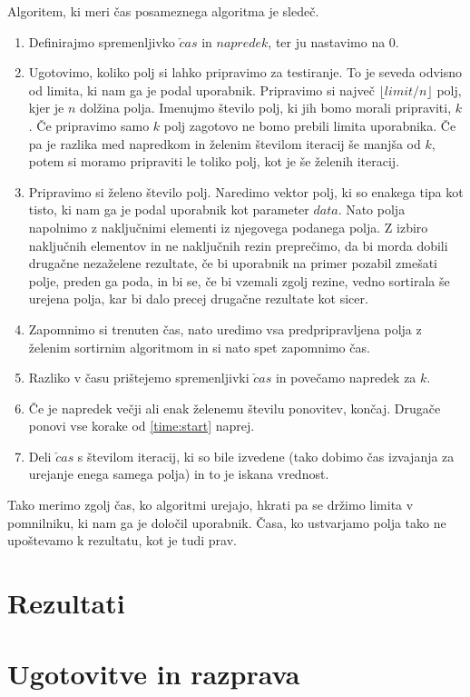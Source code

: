 \documentclass[a4paper,oneside]{article}
\begin{document}
Algoritem, ki meri čas posameznega algoritma je sledeč.
\begin{enumerate}
  \item Definirajmo spremenljivko $\check{c}as$ in $napredek$, ter ju nastavimo na 0.
  \item \label{time:start} Ugotovimo, koliko polj si lahko pripravimo za testiranje. To je seveda odvisno od
    limita, ki nam ga je podal uporabnik. Pripravimo si največ $\lfloor limit/n \rfloor$
    polj, kjer je $n$ dolžina polja. Imenujmo število polj, ki jih bomo morali pripraviti, $k$.
    Če pripravimo samo $k$ polj zagotovo ne bomo prebili limita uporabnika.
    Če pa je razlika med napredkom in želenim številom iteracij še manjša
    od $k$, potem si  moramo pripraviti le toliko polj, kot je še želenih iteracij.
  \item Pripravimo si želeno število polj. Naredimo vektor polj, ki so enakega tipa
     kot tisto, ki nam ga je podal uporabnik kot parameter $data$. Nato polja napolnimo z
     naključnimi elementi iz njegovega podanega polja. Z izbiro naključnih elementov in ne 
     naključnih rezin preprečimo, da bi morda dobili drugačne nezaželene rezultate, če bi
     uporabnik na primer pozabil zmešati polje, preden ga poda, in bi se, če bi vzemali 
     zgolj rezine, vedno sortirala še urejena polja, kar bi dalo precej drugačne rezultate 
     kot sicer.
  \item Zapomnimo si trenuten čas, nato uredimo vsa predpripravljena polja z želenim
     sortirnim algoritmom in si nato spet zapomnimo čas.
  \item Razliko v času prištejemo spremenljivki $\check{c}as$ in povečamo napredek za $k$. 
  \item Če je napredek večji ali enak želenemu številu ponovitev, končaj. 
    Drugače ponovi vse korake od \ref{time:start} naprej.
  \item Deli $\check{c}as$ s številom iteracij, ki so bile izvedene (tako dobimo čas
    izvajanja za urejanje enega samega polja) in to je iskana vrednost.
\end{enumerate}

Tako merimo zgolj čas, ko algoritmi urejajo, hkrati pa se držimo limita v pomnilniku, ki
nam ga je določil uporabnik. Časa, ko ustvarjamo polja tako ne upoštevamo k rezultatu, kot
je tudi prav.

\section{Rezultati}
\section{Ugotovitve in razprava}
\end{document}
